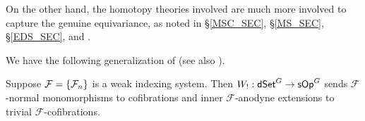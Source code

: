 \documentclass[a4paper,10pt
,draft
]{article}%
\renewcommand{\F}{\mathcal F}
\renewcommand{\1}{\eta}%
\begin{document}


On the other hand, the homotopy theories involved are much more involved to capture the genuine equivariance,
as noted in \S \ref{MSC_SEC}, \S \ref{MS_SEC}, \S \ref{EDS_SEC}, and \cite{Per_eds}.

We have the following generalization of \cite[Prop 4.5]{CM11} (see also \cite[Prop. 6.15]{Per_eds}).

\begin{proposition}
      \label{W!_COF_PROP}
      Suppose $\F = \set{\F_n}$ is a weak indexing system.
      Then $W_!: \mathsf{dSet}^G \to \mathsf{sOp}^G$ sends $\F$-normal monomorphisms to cofibrations and inner $\F$-anodyne extensions to trivial $\F$-cofibrations.
\end{proposition}
\end{document}
